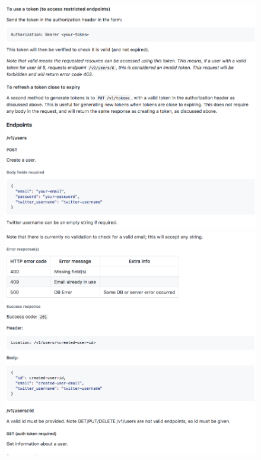 \documentclass[11pt,openright,a4paper]{report}
\begin{document}
\begin{appendices}
\begin{figure}[ht]
  \centering
  \includegraphics[width=.9\textwidth]{i/apidocs5.png}
  \includegraphics[width=.9\textwidth]{i/apidocs6.png}
\end{figure}


\end{appendices}
\end{document}
